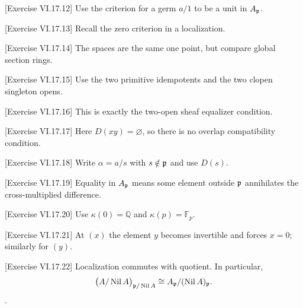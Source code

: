\begin{hint}
[Exercise VI.17.12]
Use the criterion for a germ $a/1$ to be a unit in $A_{\mathfrak p}$.
\end{hint}

\begin{hint}
[Exercise VI.17.13]
Recall the zero criterion in a localization.
\end{hint}

\begin{hint}
[Exercise VI.17.14]
The spaces are the same one point, but compare global section rings.
\end{hint}

\begin{hint}
[Exercise VI.17.15]
Use the two primitive idempotents and the two clopen singleton opens.
\end{hint}

\begin{hint}
[Exercise VI.17.16]
This is exactly the two-open sheaf equalizer condition.
\end{hint}

\begin{hint}
[Exercise VI.17.17]
Here $D(xy)=\varnothing$, so there is no overlap compatibility condition.
\end{hint}

\begin{hint}
[Exercise VI.17.18]
Write $\alpha=a/s$ with $s\notin\mathfrak p$ and use $D(s)$.
\end{hint}

\begin{hint}
[Exercise VI.17.19]
Equality in $A_{\mathfrak p}$ means some element outside $\mathfrak p$ annihilates the cross-multiplied difference.
\end{hint}

\begin{hint}
[Exercise VI.17.20]
Use $\kappa(0)=\mathbb Q$ and $\kappa(p)=\mathbb F_p$.
\end{hint}

\begin{hint}
[Exercise VI.17.21]
At $(x)$ the element $y$ becomes invertible and forces $x=0$; similarly for $(y)$.
\end{hint}

\begin{hint}
[Exercise VI.17.22]
Localization commutes with quotient.  In particular,\[\bigl(A/\operatorname{Nil} A\bigr)_{\mathfrak p/\operatorname{Nil} A}\cong A_{\mathfrak p}/(\operatorname{Nil} A)_{\mathfrak p}.\].
\end{hint}

